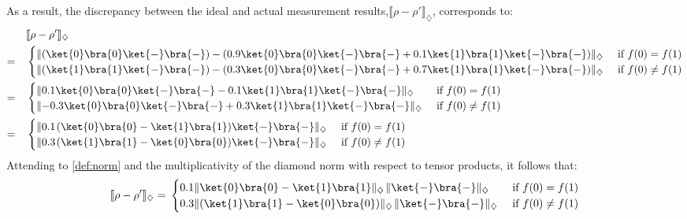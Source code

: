   As a result, the discrepancy between the ideal and actual measurement results,$\llbracket \rho - \rho' \rrbracket_{\diamondsuit} $, corresponds to:
  \begin{align}
    \quad & \llbracket \rho - \rho' \rrbracket_{\diamondsuit}  \\
      =\quad &
      \begin{cases}
        \lVert  (\ket{0} \bra{0}\ket{-} \bra{-} )- (0.9 \ket{0} \bra{0}\ket{-} \bra{-} + 0.1 \ket{1} \bra{1} \ket{-} \bra{-})  \rVert_{\diamondsuit} &\text{ if }   f(0)= f(1) \notag\\
        \lVert (\ket{1} \bra{1}  \ket{-} \bra{-}) - ( 0.3 \ket{0} \bra{0} \ket{-} \bra{-} + 0.7 \ket{1} \bra{1} \ket{-} \bra{-}) \rVert_{\diamondsuit} &\text{ if }   f(0) \neq f(1) 
      \end{cases} \notag\\
      = \quad &
      \begin{cases}
        \lVert 0.1 \ket{0} \bra{0}\ket{-} \bra{-} - 0.1\ket{1} \bra{1} \ket{-} \bra{-}   \rVert_{\diamondsuit} &\text{ if }   f(0)= f(1) \notag \\
        \lVert -0.3 \ket{0} \bra{0}\ket{-} \bra{-} + 0.3 \ket{1} \bra{1}\ket{-} \bra{-}   \rVert_{\diamondsuit} &\text{ if }   f(0) \neq f(1)
      \end{cases} \\
      = \quad &
      \begin{cases}
        \lVert 0.1 \hspace{1pt} (\ket{0} \bra{0} - \ket{1} \bra{1}) \ket{-} \bra{-}  \rVert_{\diamondsuit} &\text{ if }   f(0)= f(1) \notag \\
        \lVert  0.3  \hspace{1pt} (\ket{1} \bra{1} - \ket{0} \bra{0}) \ket{-} \bra{-}\rVert_{\diamondsuit} &\text{ if }   f(0) \neq f(1)
      \end{cases} \notag 
\end{align}
Attending to \autoref{def:norm} and the multiplicativity of the diamond norm with
respect to tensor products, it follows that:
\begin{align}
  \llbracket \rho - \rho' \rrbracket_{\diamondsuit} & = \hspace{2pt}
  \begin{cases}
    0.1  \lVert  \ket{0} \bra{0} - \ket{1} \bra{1}  \rVert_{\diamondsuit} \hspace{1pt}  \lVert  \ket{-} \bra{-}  \rVert_{\diamondsuit} &\text{ if }   f(0)= f(1) \notag \\
    0.3 \lVert  (\ket{1} \bra{1} - \ket{0} \bra{0}) \rVert_{\diamondsuit} \hspace{1pt}  \lVert \ket{-} \bra{-}\rVert_{\diamondsuit} &\text{ if }   f(0) \neq f(1)
  \end{cases} \notag  \\
\end{align}

